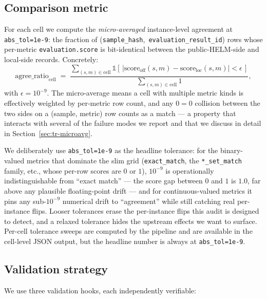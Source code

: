 \documentclass[11pt]{article}
\begin{document}
\subsection{Comparison metric}
\label{sec:tr-comparison-metric}

For each cell we compute the \emph{micro-averaged} instance-level
  agreement at \texttt{abs\_tol=1e-9}: the fraction of
  \mbox{(\texttt{sample\_hash}, \texttt{evaluation\_result\_id})}
  rows whose per-metric \texttt{evaluation.score} is bit-identical
  between the public-HELM-side and local-side records.
Concretely:
\[
  \mathrm{agree\_ratio}_{\mathrm{cell}}
  \;=\;
  \frac{\sum_{(s, m) \in \mathrm{cell}}
       \mathbb{1}[\,
         |\mathrm{score}_{\mathrm{off}}(s, m)
          - \mathrm{score}_{\mathrm{loc}}(s, m)|
         < \epsilon
       \,]}
       {\sum_{(s, m) \in \mathrm{cell}} 1},
\]
with $\epsilon = 10^{-9}$.
The micro-average means a cell with multiple metric kinds is
  effectively weighted by per-metric row count, and any $0=0$
  collision between the two sides on a (sample, metric) row counts
  as a match --- a property that interacts with several of the
  failure modes we report and that we discuss in detail in
  Section~\ref{sec:tr-microavg}.

We deliberately use \texttt{abs\_tol=1e-9} as the headline tolerance:
  for the binary-valued metrics that dominate the slim grid
  (\texttt{exact\_match}, the \texttt{*\_set\_match} family, etc.,
  whose per-row scores are $0$ or $1$), $10^{-9}$ is operationally
  indistinguishable from ``exact match'' --- the score gap between $0$
  and $1$ is $1.0$, far above any plausible floating-point drift ---
  and for continuous-valued metrics it pins any sub-$10^{-9}$
  numerical drift to ``agreement'' while still catching real
  per-instance flips.
Looser tolerances erase the per-instance flips this audit is
  designed to detect, and a relaxed tolerance hides the upstream
  effects we want to surface.
Per-cell tolerance sweeps are computed by the pipeline and are
  available in the cell-level JSON output, but the headline number is
  always at \texttt{abs\_tol=1e-9}.

\subsection{Validation strategy}
\label{sec:tr-validation}

We use three validation hooks, each independently verifiable:
\end{document}
